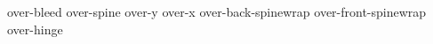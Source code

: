 %
%
%
% 
%
%
\newif\ifrotatespine
{}

\x@\edef\csname cover-bleed\endcsname{10mm}   %
\x@\edef\csname cover-spine\endcsname{11mm}   %
\x@\edef\csname cover-y\endcsname{\the\PaperHeight} %
\x@\edef\csname cover-x\endcsname{\the\PaperWidth} %
\x@\edef\csname cover-back-spinewrap\endcsname{0mm} %
\x@\edef\csname cover-front-spinewrap\endcsname{0mm} %
\x@\edef\csname cover-hinge\endcsname{0mm} %

